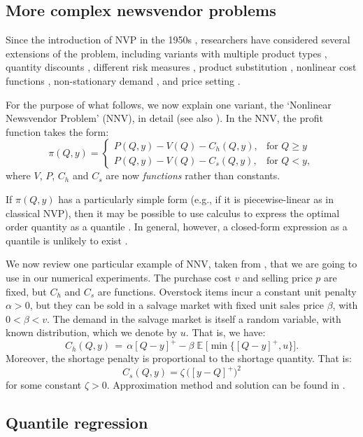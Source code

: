 \documentclass{article}
\DeclareMathOperator{\E}{\mathbb{E}}
\begin{document}
\subsection{More complex newsvendor problems} %

Since the introduction of NVP in the 1950s \cite{AHM51,MK51}, researchers have considered several extensions of the problem, including variants with multiple product types \cite{HW63,LL96,MS00}, quantity discounts \cite{Kh95}, different risk measures \cite{EGS95}, product substitution \cite{BAA99}, nonlinear cost functions \cite{HOS12}, non-stationary demand \cite{KWH15}, and price setting \cite{KC62,Mi59,PD99}.

For the purpose of what follows, we now explain one variant, the `Nonlinear Newsvendor Problem' (NNV), in detail (see also \cite{BT06,HOS12,HN16,KC62,Kh95,KK18,Mi59,PSC15,PD99,Por02,Por90}). In the NNV, the profit function takes the form:
\[
    \pi(Q,y)=
    \begin{cases}
        P(Q,y)-V(Q)-C_h(Q,y),& \text{for } Q \geq y\\
        P(Q,y)-V(Q)-C_s(Q,y),& \text{for } Q< y,
    \end{cases}
\]
where $V$, $P$, $C_h$ and $C_s$ are now \emph{functions} rather than constants.

If $\pi(Q,y)$ has a particularly simple form (e.g., if it is piecewise-linear as in classical NVP), then it may be possible to  use calculus to express the optimal order quantity as a quantile \cite{Ch12}. In general, however, a closed-form expression as a quantile is unlikely to exist \cite{HOS12,Por02,Por02}.

We now review one particular example of NNV, taken from \cite{KK18,PD99,RK02}, that we are going to use in our numerical experiments. The purchase cost $v$ and selling price $p$ are fixed, but $C_h$ and $C_s$ are functions. Overstock items incur a constant unit penalty $\alpha > 0$, but they can be sold in a salvage market with fixed unit sales price $\beta$, with $0<\beta<v$. The demand in the salvage market is itself a random variable, with known distribution, which we denote by $u$. That is, we have:
\[
    C_h(Q,y) \, = \, \alpha[Q-y]^{+} - \beta \E \Big[ \min \big\{ [Q-y]^{+},u \big\} \Big].
\]
Moreover, the shortage penalty is proportional to the shortage quantity. That is:
\[
C_s(Q,y) =  \zeta \, \big( [y-Q]^{+} \big)^2
\]
for some constant $\zeta > 0$. Approximation method and solution can be found in \cite{KK18}.

\subsection{Quantile regression} \label{sub:lit3}
\end{document}
